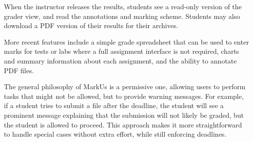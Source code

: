 \documentclass[twocolumn,10pt]{asme2e}
\begin{document}
When the instructor releases the results, students see a read-only version of the grader view, and read the annotations and marking scheme. Students may also download a PDF version of their results for their archives.

More recent features include a simple grade spreadsheet that can be used to enter marks for tests or labs where a full assignment interface is not required, charts and summary information about each assignment, and the ability to annotate PDF files.

The general philosophy of MarkUs is a permissive one, allowing users to perform tasks that might not be allowed, but to provide warning messages. For example, if a student tries to submit a file after the deadline, the student will see a prominent message explaining that the submission will not likely be graded, but the student is allowed to proceed. This approach makes it more straightforward to handle special cases without extra effort, while still enforcing deadlines.




\end{document}
